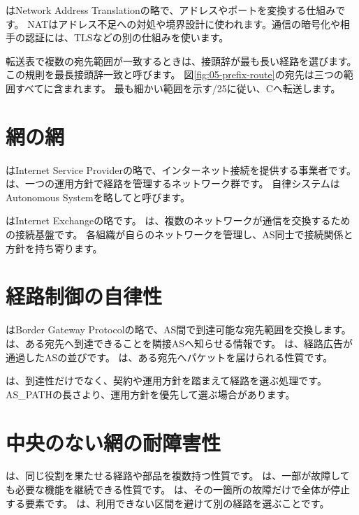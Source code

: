 はNetwork Address Translationの略で、アドレスやポートを変換する仕組みです。
NATはアドレス不足への対処や境界設計に使われます。通信の暗号化や相手の認証には、TLSなどの別の仕組みを使います。

転送表で複数の宛先範囲が一致するときは、接頭辞が最も長い経路を選びます。
この規則を最長接頭辞一致と呼びます。
図\ref{fig:05-prefix-route}の宛先は三つの範囲すべてに含まれます。
最も細かい範囲を示す/25に従い、Cへ転送します。

\section{網の網}

はInternet Service Providerの略で、インターネット接続を提供する事業者です。
は、一つの運用方針で経路を管理するネットワーク群です。
自律システムはAutonomous Systemを略してと呼びます。

はInternet Exchangeの略です。
は、複数のネットワークが通信を交換するための接続基盤です。
各組織が自らのネットワークを管理し、AS同士で接続関係と方針を持ち寄ります。

\section{経路制御の自律性}

はBorder Gateway Protocolの略で、AS間で到達可能な宛先範囲を交換します。
は、ある宛先へ到達できることを隣接ASへ知らせる情報です。
は、経路広告が通過したASの並びです。
は、ある宛先へパケットを届けられる性質です。

は、到達性だけでなく、契約や運用方針を踏まえて経路を選ぶ処理です。
AS\_PATHの長さより、運用方針を優先して選ぶ場合があります。

\section{中央のない網の耐障害性}

は、同じ役割を果たせる経路や部品を複数持つ性質です。
は、一部が故障しても必要な機能を継続できる性質です。
は、その一箇所の故障だけで全体が停止する要素です。
は、利用できない区間を避けて別の経路を選ぶことです。

